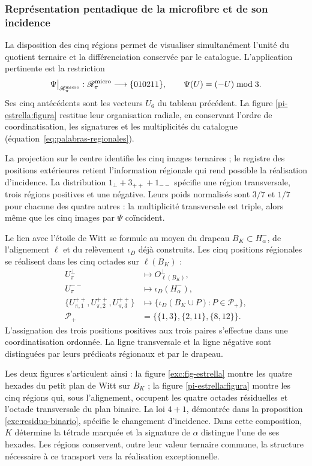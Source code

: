 \subsubsection{Représentation pentadique de la microfibre et de son incidence}
\label{pi-estrella:desarrollo}

La disposition des cinq régions permet de visualiser simultanément
l'unité du quotient ternaire et la différenciation conservée par le
catalogue. L'application pertinente est la restriction
\[
 \Psi\big|_{\mathscr R_\pi^{\rm micro}}:
 \mathscr R_\pi^{\rm micro}\longrightarrow\{010211\},
 \qquad \Psi(U)=(-U)\bmod3.
\]
Ses cinq antécédents sont les vecteurs \(U_6\) du tableau précédent. La figure \ref{pi-estrella:figura} restitue leur organisation radiale, en conservant l'ordre de coordinatisation, les signatures et les multiplicités du catalogue (équation~\eqref{eq:palabras-regionales}).



La projection sur le centre identifie les cinq images ternaires ; le
registre des positions extérieures retient l'information régionale
qui rend possible la réalisation d'incidence. La distribution
\(1_\perp+3_{++}+1_{--}\) spécifie une région transversale, trois
régions positives et une négative. Leurs poids normalisés sont
\(3/7\) et \(1/7\) pour chacune des quatre autres : la
multiplicité transversale est triple, alors même que les cinq images par
\(\Psi\) coïncident.

Le lien avec l'étoile de Witt se formule au moyen du drapeau
\(B_K\subset H^-_\alpha\), de l'alignement \(\ell\) et du
relèvement \(\iota_D\) déjà construits. Les cinq positions régionales
se réalisent dans les cinq octades sur \(\ell(B_K)\) :
\[
\begin{aligned}
 U_\pi^\perp&\longmapsto O^\perp_{\ell(B_K)},\\
 U_\pi^{--}&\longmapsto\iota_D(H^-_\alpha),\\
 \{U_{\pi,1}^{++},U_{\pi,2}^{++},U_{\pi,3}^{++}\}
 &\longmapsto
 \{\iota_D(B_K\cup P):P\in\mathcal P_+\},\\
 \mathcal P_+&=\bigl\{\{1,3\},\{2,11\},\{8,12\}\bigr\}.
\end{aligned}
\]
L'assignation des trois positions positives aux trois paires
s'effectue dans une coordinatisation ordonnée. La ligne transversale et la ligne négative
sont distinguées par leurs prédicats régionaux et par le drapeau.

Les deux figures s'articulent ainsi : la figure
\ref{exc:fig-estrella} montre les quatre hexades du petit plan
de Witt sur \(B_K\) ; la figure \ref{pi-estrella:figura} montre
les cinq régions qui, sous l'alignement, occupent les quatre octades
résiduelles et l'octade transversale du plan binaire. La loi
\(4+1\), démontrée dans la proposition
\ref{exc:residuo-binario}, spécifie le changement d'incidence. Dans cette
composition, \(K\) détermine la tétrade marquée et la signature de
\(\alpha\) distingue l'une de ses hexades. Les régions conservent,
outre leur valeur ternaire commune, la structure nécessaire à ce
transport vers la réalisation exceptionnelle.
